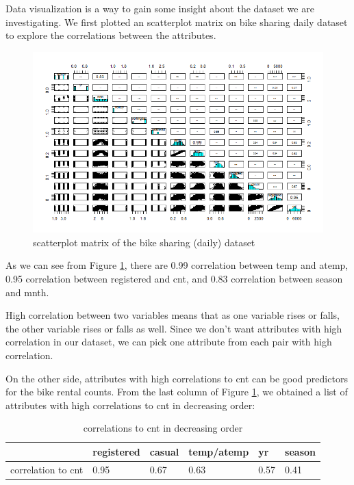 \documentclass[12pt]{article}
\begin{document}
	Data visualization is a way to gain some insight about the dataset we are investigating. We first plotted an scatterplot matrix on bike sharing daily dataset to explore the correlations between the attributes.
	\begin{figure}[H]
		\includegraphics[scale=0.6]{figures/scatterplot.png}
		\caption{scatterplot matrix of the bike sharing (daily) dataset}
		\label{fig:scatterplot}
	\end{figure}
	
	As we can see from Figure \ref{fig:scatterplot}, there are 0.99 correlation between temp and atemp, 0.95 correlation between registered and cnt, and 0.83 correlation between season and mnth.
	
	High correlation between two variables means that as one variable rises or falls, the other variable rises or falls as well. Since we don't want attributes with high correlation in our dataset, we can pick one attribute from each pair with high correlation.
	
	On the other side, attributes with high correlations to cnt can be good predictors for the bike rental counts. From the last column of Figure \ref{fig:scatterplot}, we obtained a list of attributes with high correlations to cnt in decreasing order: 
	\begin{table}[H]
		\centering
		\begin{tabular}{| l | l | l | l | l | l|}
			\hline
			& registered & casual & temp/atemp & yr & season\\
			\hline
			 correlation to cnt& 0.95 & 0.67 & 0.63 & 0.57 & 0.41\\
			\hline
		\end{tabular}
		\caption{correlations to cnt in decreasing order}
	\end{table}
	
\end{document}
